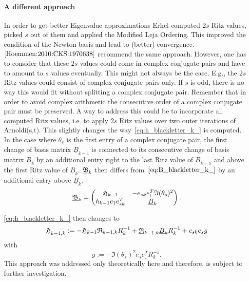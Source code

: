 \documentclass{scrartcl}
\begin{document}
\paragraph{A different approach}
In order to get better Eigenvalue approximations Erhel \cite{Erhel95aparallel} computed 2$s$ Ritz values, picked $s$ out of them and applied the Modified Leja Ordering. This improved the condition of the Newton basis and lead to (better) convergence. $\cite{Hoemmen:2010:CKS:1970638}$ recommend the same approach. However, one has to consider that these 2$s$ values could come in complex conjugate pairs and have to amount to $s$ values eventually. This might not always be the case. E.g., the 2$s$ Ritz values could consist of complex conjugate pairs only. If $s$ is odd, there is no way this would fit without splitting a complex conjugate pair. Remember that in order to avoid complex arithmetic the consecutive order of a complex conjugate pair must be preserved. A way to address this could be to incorporate all computed Ritz values, i.e. to apply 2$s$ Ritz values over two outer iterations of Arnoldi(s,t). This slightly changes the way~\eqref{eq:h_blackletter_k_} is computed. In the case where $\theta_s$ is the first entry of a complex conjugate pair, the first change of basis matrix $\underline{B}_{k - 1 }$ is connected to its consecutive change of basis matrix $\underline{B}_{k}$ by an additional entry right to the last Ritz value of $\underline{B}_{k - 1}$ and above the first Ritz value of $\underline{B}_k$. $\underline{\frak{B}}_k$ then differs from~$\eqref{eq:B_blackletter_k_}$ by an additional entry above $\underline{B}_k$.
\begin{equation}
\underline{\frak{B}}_{k} = 
\begin{pmatrix}
	\frak{H}_{k - 1} & -e_{sk} e^T_1 \Im (\theta_s)^2 \\
	h_{k - 1} e_1 e^T_{sk} & \underline{B}_k
\end{pmatrix}.
\end{equation}

\eqref{eq:h_blackletter_k_} then changes to
\begin{equation}
\underline{\frak{H}}_{k - 1, k} := -\frak{H}_{k - 1} \frak{R}_{k - 1, k} R^{-1}_k + \underline{\frak{R}}_{k - 1, k} \underline{B}_k R^{-1}_k + e_{sk} e_s g
\end{equation}
with
\begin{equation*}
g := - \Im (\theta_s)^2 e_{s} e^T_1  R^{-1}_{k}.
\end{equation*}
This approach was addressed only theoretically here and therefore, is subject to further investigation.
\end{document}
